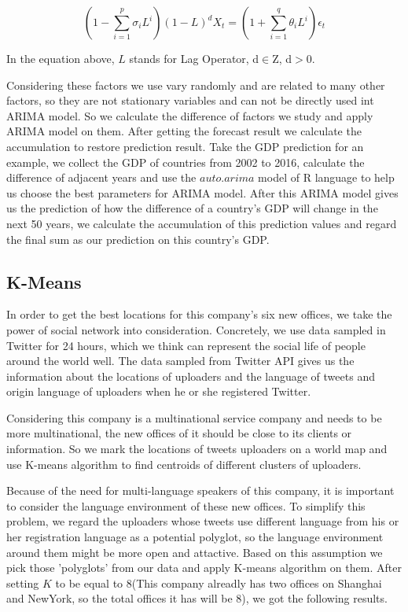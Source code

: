 \documentclass{mcmthesis}
\begin{document}
  \begin{equation}
    \left(1-\sum^p_{i=1}\sigma_i L^i\right)(1-L)^d X_t = \left(1+\sum^q_{i=1}\theta_i L^i\right)\epsilon_t
  \end{equation}

  \indent In the equation above, $L$ stands for Lag Operator, d$\in$Z, d$>$0.

  \indent Considering these factors we use vary randomly and are related to many other factors, so they are not stationary variables and can not be directly used int ARIMA model. So we calculate the difference of factors we study and apply ARIMA model on them. After getting the forecast result we calculate the accumulation to restore prediction result. Take the GDP prediction for an example, we collect the GDP of countries from 2002 to 2016, calculate the difference of adjacent years and use the $auto.arima$ model of R language to help us choose the best parameters for ARIMA model. After this ARIMA model gives us the prediction of how the difference of a country's GDP will change in the next 50 years, we calculate the accumulation of this prediction values and regard the final sum as our prediction on this country's GDP.

  \subsection{K-Means}
  \indent \indent In order to get the best locations for this company's six new offices, we take the power of social network into consideration. Concretely, we use data sampled in Twitter for 24 hours, which we think can represent the social life of people around the world well. The data sampled from Twitter API gives us the information about the locations of uploaders and the language of tweets and origin language of uploaders when he or she registered Twitter. 

  \indent Considering this company is a multinational service company and needs to be more multinational, the new offices of it should be close to its clients or information. So we mark the locations of tweets uploaders on a world map and use K-means algorithm to find centroids of different clusters of uploaders.
  
  \indent Because of the need for multi-language speakers of this company, it is important to consider the language environment of these new offices. To simplify this problem, we regard the uploaders whose tweets use different language from his or her registration language as a potential polyglot, so the language environment around them might be more open and attactive. Based on this assumption we pick those 'polyglots' from our data and apply K-means algorithm on them. After setting $K$ to be equal to 8(This company alreadly has two offices on Shanghai and NewYork, so the total offices it has will be 8), we got the following results.
\end{document}
